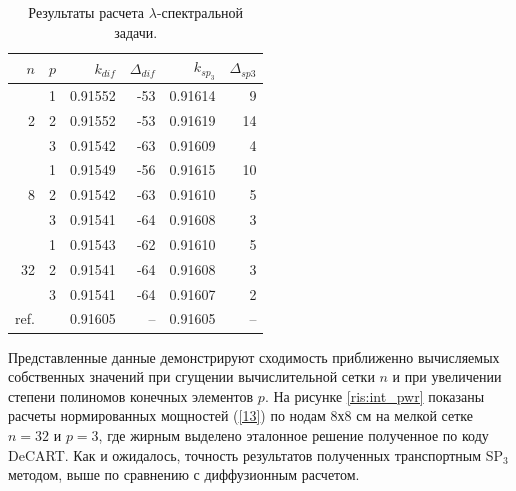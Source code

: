 \documentclass{crm-article}
\begin{document}
\begin{table}[h]
\caption{Результаты расчета $\lambda$-спектральной задачи.}
\label{table:t2-lamda}
\begin{center}
\begin{tabular}{r r r r r r}
\hline
$n$ & $p$ & $k_{dif}$ & $\Delta_{dif}$ & $k_{sp_3}$ & $\Delta_{sp3}$\\
\hline
	& 1	& 0.91552 & -53& 0.91614 & 9 \\
2	& 2	& 0.91552 & -53& 0.91619 &14 \\
	& 3	& 0.91542 & -63& 0.91609 & 4 \\ 
\hline
	& 1	& 0.91549 & -56& 0.91615 & 10\\
8& 2	& 0.91542 & -63& 0.91610 & 5 \\
	& 3	& 0.91541 & -64& 0.91608 & 3 \\ 
\hline
	& 1	& 0.91543 & -62& 0.91610 & 5 \\
32& 2	& 0.91541 & -64& 0.91608 & 3 \\
	& 3	& 0.91541 & -64& 0.91607 & 2 \\
\hline
ref.&   & 0.91605 & -- & 0.91605 & --\\
\hline
\end{tabular}
\end{center}
\end{table}

Представленные данные демонстрируют сходимость приближенно вычисляемых собственных значений при сгущении вычислительной сетки $n$ и при увеличении степени полиномов конечных элементов $p$.
На рисунке \ref{ris:int_pwr} показаны расчеты нормированных мощностей (\ref{13}) по нодам 8х8 см на мелкой сетке $n=32$ и $p=3$, где жирным выделено эталонное решение полученное по коду DeCART.
Как и ожидалось, точность результатов полученных транспортным SP$_3$ методом, выше по сравнению с диффузионным расчетом.
\end{document}
